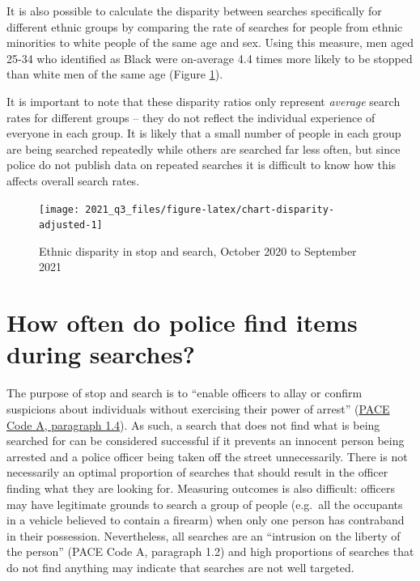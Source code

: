 \documentclass[
  a4paper,
  twoside, 11pt]{article}
\begin{document}
It is also possible to calculate the disparity between searches specifically for different ethnic groups by comparing the rate of searches for people from ethnic minorities to white people of the same age and sex. Using this measure, men aged 25-34 who identified as Black were on-average 4.4 times more likely to be stopped than white men of the same age (Figure \ref{fig:chart-disparity-adjusted}).

It is important to note that these disparity ratios only represent \emph{average} search rates for different groups -- they do not reflect the individual experience of everyone in each group. It is likely that a small number of people in each group are being searched repeatedly while others are searched far less often, but since police do not publish data on repeated searches it is difficult to know how this affects overall search rates.



\begin{figure}[tb]

{\centering \texttt{[image: 2021\_q3\_files/figure-latex/chart-disparity-adjusted-1]} 

}

\caption{Ethnic disparity in stop and search, October 2020 to September 2021}\label{fig:chart-disparity-adjusted}
\end{figure}

\hypertarget{how-often-do-police-find-items-during-searches}{%
\section{How often do police find items during searches?}\label{how-often-do-police-find-items-during-searches}}

The purpose of stop and search is to ``enable officers to allay or confirm suspicions about individuals without exercising their power of arrest'' (\href{https://www.gov.uk/guidance/police-and-criminal-evidence-act-1984-pace-codes-of-practice}{PACE Code A, paragraph 1.4}). As such, a search that does not find what is being searched for can be considered successful if it prevents an innocent person being arrested and a police officer being taken off the street unnecessarily. There is not necessarily an optimal proportion of searches that should result in the officer finding what they are looking for. Measuring outcomes is also difficult: officers may have legitimate grounds to search a group of people (e.g.~all the occupants in a vehicle believed to contain a firearm) when only one person has contraband in their possession. Nevertheless, all searches are an ``intrusion on the liberty of the person'' (PACE Code A, paragraph 1.2) and high proportions of searches that do not find anything may indicate that searches are not well targeted.
\end{document}

